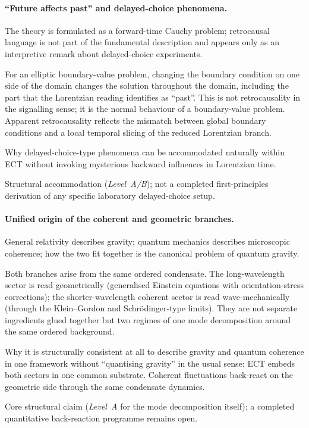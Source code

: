 \documentclass[11pt,a4paper]{article}
\begin{document}
\paragraph{``Future affects past'' and delayed-choice phenomena.}
\begin{description}[leftmargin=2.8cm, style=nextline]
\item[Standard QM.] The theory is formulated as a forward-time Cauchy problem; retrocausal language is not part of the fundamental description and appears only as an interpretive remark about delayed-choice experiments.
\item[ECT (physical picture).] For an elliptic boundary-value problem, changing the boundary condition on one side of the domain changes the solution throughout the domain, including the part that the Lorentzian reading identifies as ``past''.  This is not retrocausality in the signalling sense; it is the normal behaviour of a boundary-value problem.  Apparent retrocausality reflects the mismatch between global boundary conditions and a local temporal slicing of the reduced Lorentzian branch.
\item[What this explains.] Why delayed-choice-type phenomena can be accommodated naturally within ECT without invoking mysterious backward influences in Lorentzian time.
\item[Status.] Structural accommodation (\emph{Level~A/B}); not a completed first-principles derivation of any specific laboratory delayed-choice setup.
\end{description}

\paragraph{Unified origin of the coherent and geometric branches.}
\begin{description}[leftmargin=2.8cm, style=nextline]
\item[Standard physics.] General relativity describes gravity; quantum mechanics describes microscopic coherence; how the two fit together is the canonical problem of quantum gravity.
\item[ECT (physical picture).] Both branches arise from the same ordered condensate.  The long-wavelength sector is read geometrically (generalised Einstein equations with orientation-stress corrections); the shorter-wavelength coherent sector is read wave-mechanically (through the Klein--Gordon and Schr\"odinger-type limits).  They are not separate ingredients glued together but two regimes of one mode decomposition around the same ordered background.
\item[What this explains.] Why it is structurally consistent at all to describe gravity and quantum coherence in one framework without ``quantising gravity'' in the usual sense: ECT embeds both sectors in one common substrate.  Coherent fluctuations back-react on the geometric side through the same condensate dynamics.
\item[Status.] Core structural claim (\emph{Level~A} for the mode decomposition itself); a completed quantitative back-reaction programme remains open.
\end{description}
\end{document}
